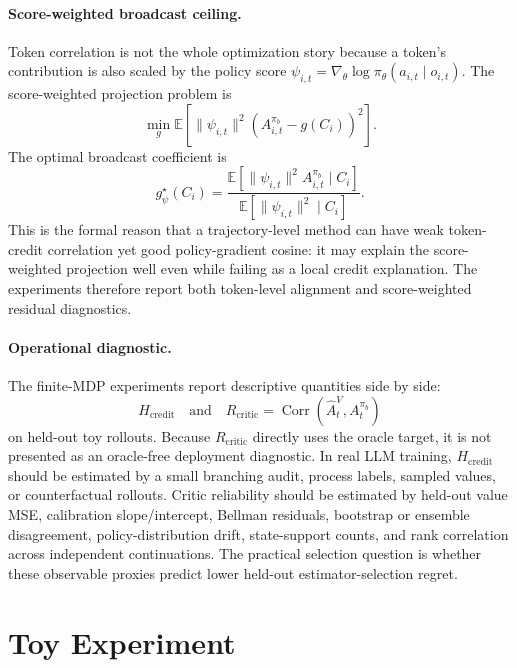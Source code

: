 \documentclass[11pt]{article}
\newcommand{\E}{\mathbb{E}}
\begin{document}
\paragraph{Score-weighted broadcast ceiling.}
Token correlation is not the whole optimization story because a token's
contribution is also scaled by the policy score
$\psi_{i,t}=\nabla_\theta\log\pi_\theta(a_{i,t}\mid o_{i,t})$. The
score-weighted projection problem is
\begin{equation}
\min_g
\E\!\left[
  \|\psi_{i,t}\|^2
  \left(A^{\pi_b}_{i,t}-g(C_i)\right)^2
\right].
\end{equation}
The optimal broadcast coefficient is
\begin{equation}
g^\star_{\psi}(C_i)
=
\frac{
  \E[\|\psi_{i,t}\|^2 A^{\pi_b}_{i,t}\mid C_i]
}{
  \E[\|\psi_{i,t}\|^2\mid C_i]
}.
\end{equation}
This is the formal reason that a trajectory-level method can have weak
token-credit correlation yet good policy-gradient cosine: it may explain the
score-weighted projection well even while failing as a local credit
explanation. The experiments therefore report both token-level alignment and
score-weighted residual diagnostics.

\paragraph{Operational diagnostic.}
The finite-MDP experiments report descriptive quantities side by side:
\begin{equation}
H_{\mathrm{credit}}
\quad\text{and}\quad
R_{\mathrm{critic}} =
\operatorname{Corr}(\widehat A^{V}_t,A^{\pi_b}_t)
\end{equation}
on held-out toy rollouts. Because $R_{\mathrm{critic}}$ directly uses the
oracle target, it is not presented as an oracle-free deployment diagnostic. In
real LLM training, $H_{\mathrm{credit}}$ should be estimated by a small
branching audit, process labels, sampled values, or counterfactual rollouts.
Critic reliability should be estimated by held-out value MSE, calibration
slope/intercept, Bellman residuals, bootstrap or ensemble disagreement,
policy-distribution drift, state-support counts, and rank correlation across
independent continuations. The practical selection question is whether these
observable proxies predict lower held-out estimator-selection regret.

\section{Toy Experiment}
\end{document}

